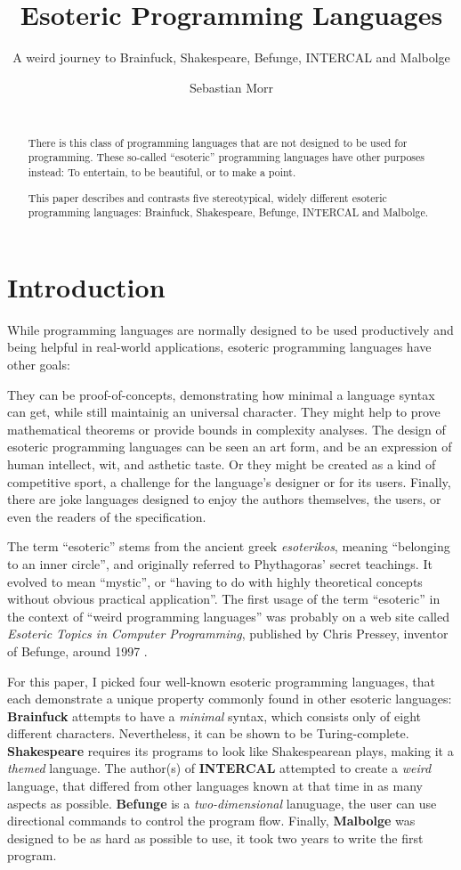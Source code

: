 \documentclass{sig-alternate}
\title{Esoteric Programming Languages}
\subtitle{A weird journey to Brainfuck, Shakespeare, Befunge, INTERCAL and Malbolge}
\author{\alignauthor Sebastian Morr\\\affaddr{Technical University Braunschweig, Germany}\\\email{sebastian@morr.cc}}
\begin{document}
\maketitle

\begin{abstract}
    There is this class of programming languages that are not designed to be used for programming. These so-called “esoteric” programming languages have other purposes instead: To entertain, to be beautiful, or to make a point.

    This paper describes and contrasts five stereotypical, widely different esoteric programming languages: Brainfuck, Shakespeare, Befunge, INTERCAL and Malbolge.
\end{abstract}

\section{Introduction}

While programming languages are normally designed to be used productively and being helpful in real-world applications, esoteric programming languages have other goals:

They can be proof-of-concepts, demonstrating how minimal a language syntax can get, while still maintainig an universal character. They might help to prove mathematical theorems or provide bounds in complexity analyses. The design of esoteric programming languages can be seen an art form, and be an expression of human intellect, wit, and asthetic taste. Or they might be created as a kind of competitive sport, a challenge for the language's designer or for its users. Finally, there are joke languages designed to enjoy the authors themselves, the users, or even the readers of the specification.

The term “esoteric” stems from the ancient greek \emph{esoterikos}, meaning “belonging to an inner circle”, and originally referred to Phythagoras' secret teachings. It evolved to mean “mystic”, or “having to do with highly theoretical concepts without obvious practical application”. The first usage of the term “esoteric” in the context of “weird programming languages” was probably on a web site called \emph{Esoteric Topics in Computer Programming}, published by Chris Pressey, inventor of Befunge, around 1997 \cite{pressey2005chris}.

For this paper, I picked four well-known esoteric programming languages, that each demonstrate a unique property commonly found in other esoteric languages: \textbf{Brainfuck} attempts to have a \textit{minimal} syntax, which consists only of eight different characters. Nevertheless, it can be shown to be Turing-complete. \textbf{Shakespeare} requires its programs to look like Shakespearean plays, making it a \textit{themed} language. The author(s) of \textbf{INTERCAL} attempted to create a \textit{weird} language, that differed from other languages known at that time in as many aspects as possible. \textbf{Befunge} is a \textit{two-dimensional} lanuguage, the user can use directional commands to control the program flow. Finally, \textbf{Malbolge} was designed to be as hard as possible to use, it took two years to write the first program.
\end{document}
